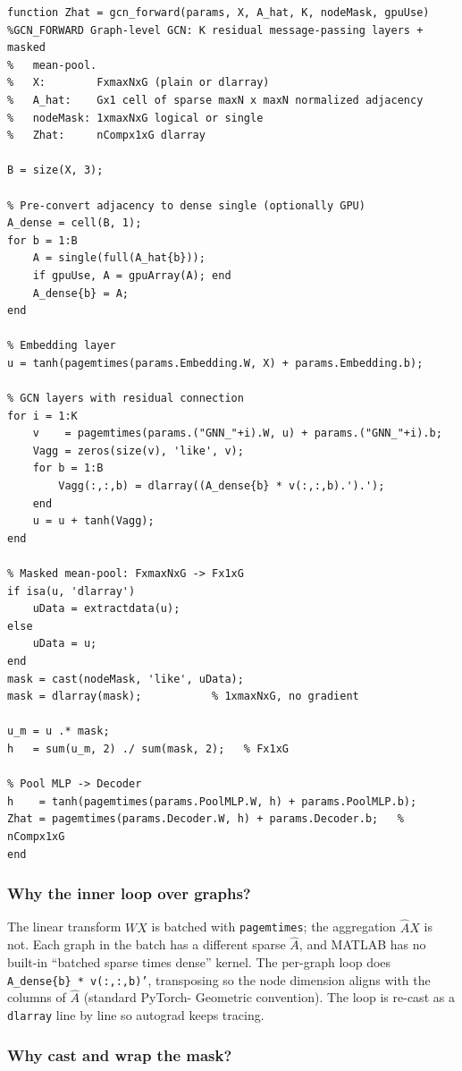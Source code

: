 \documentclass[11pt]{article}
\begin{document}
\begin{lstlisting}[caption={\texttt{helpers/gcn\_forward.m}}]
function Zhat = gcn_forward(params, X, A_hat, K, nodeMask, gpuUse)
%GCN_FORWARD Graph-level GCN: K residual message-passing layers + masked
%   mean-pool.
%   X:        FxmaxNxG (plain or dlarray)
%   A_hat:    Gx1 cell of sparse maxN x maxN normalized adjacency
%   nodeMask: 1xmaxNxG logical or single
%   Zhat:     nCompx1xG dlarray

B = size(X, 3);

% Pre-convert adjacency to dense single (optionally GPU)
A_dense = cell(B, 1);
for b = 1:B
    A = single(full(A_hat{b}));
    if gpuUse, A = gpuArray(A); end
    A_dense{b} = A;
end

% Embedding layer
u = tanh(pagemtimes(params.Embedding.W, X) + params.Embedding.b);

% GCN layers with residual connection
for i = 1:K
    v    = pagemtimes(params.("GNN_"+i).W, u) + params.("GNN_"+i).b;
    Vagg = zeros(size(v), 'like', v);
    for b = 1:B
        Vagg(:,:,b) = dlarray((A_dense{b} * v(:,:,b).').');
    end
    u = u + tanh(Vagg);
end

% Masked mean-pool: FxmaxNxG -> Fx1xG
if isa(u, 'dlarray')
    uData = extractdata(u);
else
    uData = u;
end
mask = cast(nodeMask, 'like', uData);
mask = dlarray(mask);           % 1xmaxNxG, no gradient

u_m = u .* mask;
h   = sum(u_m, 2) ./ sum(mask, 2);   % Fx1xG

% Pool MLP -> Decoder
h    = tanh(pagemtimes(params.PoolMLP.W, h) + params.PoolMLP.b);
Zhat = pagemtimes(params.Decoder.W, h) + params.Decoder.b;   % nCompx1xG
end
\end{lstlisting}

\subsubsection*{Why the inner loop over graphs?}

The linear transform $WX$ is batched with \texttt{pagemtimes}; the
aggregation $\hat A X$ is not. Each graph in the batch has a different sparse
$\hat A$, and MATLAB has no built-in ``batched sparse times dense'' kernel.
The per-graph loop does \texttt{A\_dense\{b\} * v(:,:,b)'}, transposing so
the node dimension aligns with the columns of $\hat A$ (standard PyTorch-
Geometric convention). The loop is re-cast as a \texttt{dlarray} line by
line so autograd keeps tracing.

\subsubsection*{Why cast and wrap the mask?}
\end{document}
